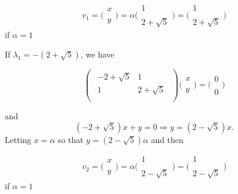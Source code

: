 \documentclass[12pt,a4paper]{article}
\begin{document}
\begin{enumerate}
\begin{equation*}
v_1=\bigg(\begin{smallmatrix} x \\\\ y \end{smallmatrix}\bigg)=\alpha \bigg(\begin{smallmatrix} 1 \\\\  2+ \sqrt{5} \end{smallmatrix}\bigg)=\bigg(\begin{smallmatrix} 1 \\\\  2+ \sqrt{5} \end{smallmatrix}\bigg)
\end{equation*}
if $\alpha=1$





If $\lambda_1 = -(2 + \sqrt{5})$, we have



\begin{equation}
 \begin{pmatrix}  {\begin{array}{cc}
   -2+\sqrt{5} & 1 \\
   1 & 2 + \sqrt{5} \\
  \end{array} } \end{pmatrix}\bigg(\begin{smallmatrix} x \\\\y \end{smallmatrix}\bigg)= \bigg(\begin{smallmatrix} 0 \\\\ 0 \end{smallmatrix}\bigg)
\end{equation}

and
\begin{equation*}
( -2+\sqrt{5})x  + y = 0\Rightarrow y=( 2- \sqrt{5})x.
\end{equation*}
Letting $x =\alpha$  so that $y=( 2- \sqrt{5})\alpha $ and then

\begin{equation*}
v_2=\bigg(\begin{smallmatrix} x \\\\ y \end{smallmatrix}\bigg)=\alpha \bigg(\begin{smallmatrix} 1 \\\\  2- \sqrt{5} \end{smallmatrix}\bigg)=\bigg(\begin{smallmatrix} 1 \\\\  2- \sqrt{5} \end{smallmatrix}\bigg)
\end{equation*}
if $\alpha=1$



\end{enumerate}
\end{document}
